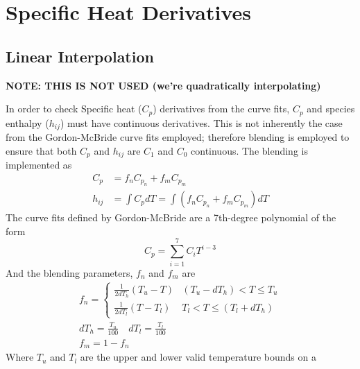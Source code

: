 \documentclass{article}   	%
\begin{document}
\section{Specific Heat Derivatives}
\subsection{Linear Interpolation}

\textbf{NOTE: THIS IS NOT USED (we're quadratically interpolating)}
\vspace{4mm}

In order to check Specific heat ($C_p$) derivatives from the curve fits, $C_p$
and species enthalpy ($h_{ij}$) must have continuous derivatives.  This is not
inherently the case from the Gordon-McBride curve fits employed; therefore
blending is employed to ensure that both $C_p$ and $h_{ij}$ are $C_1$ and $C_0$
continuous.  The blending is implemented as
\begin{align}
  C_p &= f_n C_{p_n} + f_m C_{p_m} \\
  h_{ij} &= \int C_p dT = \int (f_n C_{p_n} + f_m C_{p_m}) dT
  \label{blending}
\end{align}
The curve fits defined by Gordon-McBride are a 7th-degree polynomial of the form
\begin{equation}
  C_p = \sum_{i=1}^{7} C_i T^{i-3}
  \label{cp_form}
\end{equation}
And the blending parameters, $f_n$ and $f_m$ are
\begin{gather}
  f_n = 
  \begin{cases}
    \frac{1}{2 dT_h} (T_u - T)  &(T_u - dT_h) < T \leq T_u \\
    \frac{1}{2 dT_l} (T - T_l)  &T_l < T \leq (T_l + dT_h)
  \end{cases} \\
  dT_h = \frac{T_u}{100} \quad dT_l = \frac{T_l}{100} \\
  f_m = 1 - f_n
  \label{blending_fxns}
\end{gather}
Where $T_u$ and $T_l$ are the upper and lower valid temperature bounds on a
\end{document}
